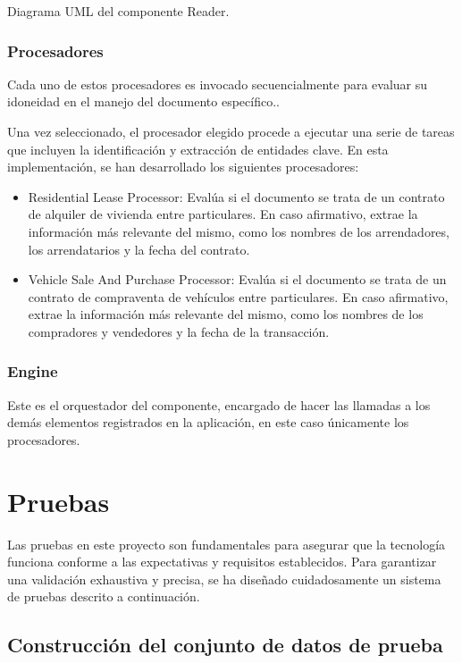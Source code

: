 Diagrama UML del componente Reader.

\subsubsection*{Procesadores}
Cada uno de estos procesadores es invocado secuencialmente para evaluar su idoneidad en el manejo del documento
específico..

Una vez seleccionado, el procesador elegido procede a ejecutar una serie de tareas que incluyen la identificación y
extracción de entidades clave. En esta implementación, se han desarrollado los siguientes procesadores:

\begin{itemize}
    \item Residential Lease Processor: Evalúa si el documento se trata de un contrato de alquiler de vivienda entre
    particulares. En caso afirmativo, extrae la información más relevante del mismo, como los nombres de los
    arrendadores, los arrendatarios y la fecha del contrato.
    \item Vehicle Sale And Purchase Processor: Evalúa si el documento se trata de un contrato de compraventa de
    vehículos
    entre particulares. En caso afirmativo, extrae la información más relevante del mismo, como los nombres de los
    compradores y vendedores y la fecha de la transacción.
\end{itemize}

\subsubsection*{Engine}
Este es el orquestador del componente, encargado de hacer las llamadas a los demás elementos registrados en la
aplicación, en este caso únicamente los procesadores.

\section*{Pruebas}
Las pruebas en este proyecto son fundamentales para asegurar que la tecnología funciona conforme a las expectativas y
requisitos establecidos. Para garantizar una validación exhaustiva y precisa, se ha diseñado cuidadosamente un sistema
de pruebas descrito a continuación.

\subsection*{Construcción del conjunto de datos de prueba}

